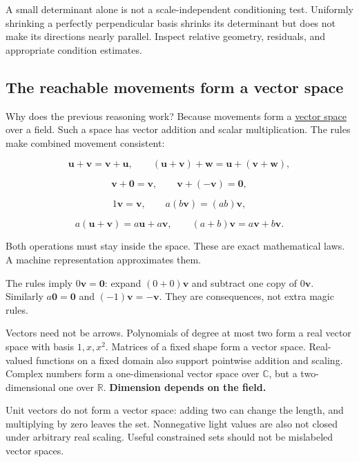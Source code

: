 A small determinant alone is not a scale-independent conditioning test. Uniformly shrinking a perfectly perpendicular basis shrinks its determinant but does not make its directions nearly parallel. Inspect relative geometry, residuals, and appropriate condition estimates.

\subsection{The reachable movements form a vector space}\label{01-foundations-i-ch017-the-reachable-movements-form-a-vector-space}

Why does the previous reasoning work? Because movements form a \hyperref[01-foundations-i-ch017-the-reachable-movements-form-a-vector-space]{vector space} over a field. Such a space has vector addition and scalar multiplication. The rules make combined movement consistent:

\[
\mathbf u+\mathbf v=\mathbf v+\mathbf u,\qquad
(\mathbf u+\mathbf v)+\mathbf w=\mathbf u+(\mathbf v+\mathbf w),
\]

\[
\mathbf v+\mathbf0=\mathbf v,\qquad
\mathbf v+(-\mathbf v)=\mathbf0,
\]

\[
1\mathbf v=\mathbf v,\qquad
a(b\mathbf v)=(ab)\mathbf v,
\]

\[
a(\mathbf u+\mathbf v)=a\mathbf u+a\mathbf v,\qquad
(a+b)\mathbf v=a\mathbf v+b\mathbf v.
\]

Both operations must stay inside the space. These are exact mathematical laws. A machine representation approximates them.

The rules imply \(0\mathbf v=\mathbf0\): expand \((0+0)\mathbf v\) and subtract one copy of \(0\mathbf v\). Similarly \(a\mathbf0=\mathbf0\) and \((-1)\mathbf v=-\mathbf v\). They are consequences, not extra magic rules.

Vectors need not be arrows. Polynomials of degree at most two form a real vector space with basis \(1,x,x^2\). Matrices of a fixed shape form a vector space. Real-valued functions on a fixed domain also support pointwise addition and scaling. Complex numbers form a one-dimensional vector space over \(\mathbb C\), but a two-dimensional one over \(\mathbb R\). \textbf{Dimension depends on the field.}

Unit vectors do not form a vector space: adding two can change the length, and multiplying by zero leaves the set. Nonnegative light values are also not closed under arbitrary real scaling. Useful constrained sets should not be mislabeled vector spaces.


